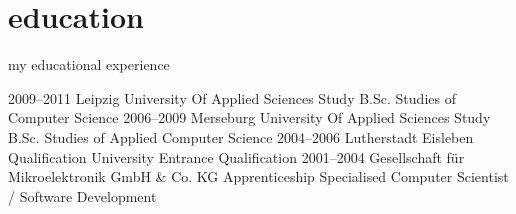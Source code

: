 \documentclass[]{friggeri-cv}
\begin{document}


\pagebreak

\section{education}
my educational experience

\begin{entrylist}
  \entry
    {2009–2011}
    {Leipzig University Of Applied Sciences}
    {Study B.Sc.}
    {Studies of Computer Science}
  \entry
    {2006–2009}
    {Merseburg University Of Applied Sciences}
    {Study B.Sc.}
    {Studies of Applied Computer Science}
  \entry
    {2004–2006}
    {Lutherstadt Eisleben}
    {Qualification}
    {University Entrance Qualification}
  \entry
    {2001–2004}
    {Gesellschaft für Mikroelektronik GmbH \& Co. KG}
    {Apprenticeship}
    {Specialised Computer Scientist / Software Development}
\end{entrylist}
\end{document}
